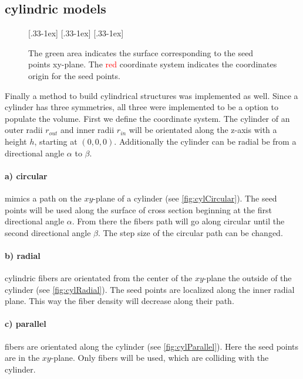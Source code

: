 \subsection{cylindric models}
% 
\begin{figure}[!t]
    \centering
    \setlength{\tikzwidth}{0.31\textwidth}
    [.33\textwidth-1ex]{
    }\hfill
    [.33\textwidth-1ex]{
    }\hfill
    [.33\textwidth-1ex]{
    }
	\caption{The green area indicates the surface corresponding to the seed points xy-plane. The \textcolor{red}{red} coordinate system indicates the coordinates origin for the seed points.}
\end{figure}
% 
Finally a method to build cylindrical structures was implemented as well.
Since a cylinder has three symmetries, all three were implemented to be a option to populate the volume.
First we define the coordinate system.
The cylinder of an outer radii $r_{\mathit{out}}$ and inner radii $r_{\mathit{in}}$ will be orientated along the z-axis with a height $h$, starting at $(0,0,0)$.
Additionally the cylinder can be radial be  from a directional angle $\alpha$ to $\beta$.
% 
\paragraph{a) circular} mimics a path on the $xy$-plane of a cylinder (see \cref{fig:cylCircular}).
The seed points will be used along the surface of cross section beginning at the first directional angle $\alpha$.
From there the fibers path will go along circular until the second directional angle $\beta$.
The step size of the circular path can be changed.
% 
\paragraph{b) radial} cylindric fibers are orientated from the center of the $xy$-plane the outside of the cylinder (see \cref{fig:cylRadial}).
The seed points are localized along the inner radial plane.
This way the fiber density will decrease along their path.
% 
\paragraph{c) parallel} fibers are orientated along the cylinder (see \cref{fig:cylParallel}).
Here the seed points are in the $xy$-plane. Only fibers will be used, which are colliding with the cylinder.
% 
